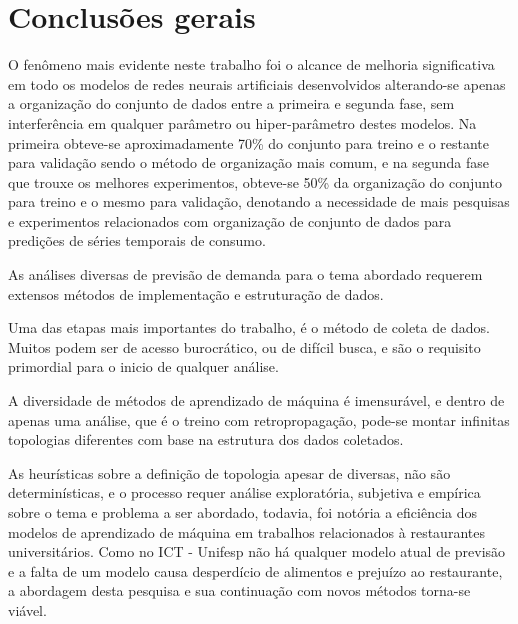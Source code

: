     \section{Conclusões gerais}
        O fenômeno mais evidente neste trabalho foi o alcance de melhoria significativa em todo os modelos de redes neurais artificiais desenvolvidos alterando-se apenas a organização do conjunto de dados entre a primeira e segunda fase, sem interferência em qualquer parâmetro ou hiper-parâmetro destes modelos. Na primeira obteve-se aproximadamente 70\% do conjunto para treino e o restante para validação sendo o método de organização mais comum, e na segunda fase que trouxe os melhores experimentos, obteve-se 50\% da organização do conjunto para treino e o mesmo para validação, denotando a necessidade de mais pesquisas e experimentos relacionados com organização de conjunto de dados para predições de séries temporais de consumo.
        
        As análises diversas de previsão de demanda para o tema abordado requerem extensos métodos de implementação e estruturação de dados.
        
        Uma das etapas mais importantes do trabalho, é o método de coleta de dados. Muitos podem ser de acesso burocrático, ou de difícil busca, e são o requisito primordial para o inicio de qualquer análise.
        
        A diversidade de métodos de aprendizado de máquina é imensurável, e dentro de apenas uma análise, que é o treino com retropropagação, pode-se montar infinitas topologias diferentes com base na estrutura dos dados coletados. 
        
        As heurísticas sobre a definição de topologia apesar de diversas, não são determinísticas, e o processo requer análise exploratória, subjetiva e empírica sobre o tema e problema a ser abordado, todavia, foi notória a eficiência dos modelos de aprendizado de máquina em trabalhos relacionados à restaurantes universitários. Como no ICT - Unifesp não há qualquer modelo atual de previsão e a falta de um modelo causa desperdício de alimentos e prejuízo ao restaurante, a abordagem desta pesquisa e sua continuação com novos métodos torna-se viável.